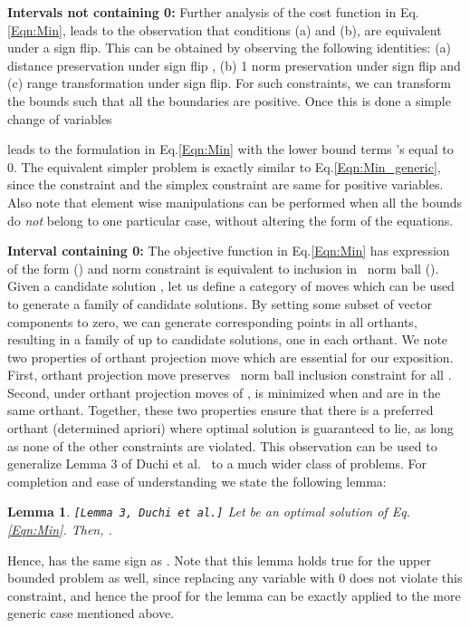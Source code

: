 \documentclass{article}
\newtheorem{lemma}{Lemma}
\def\Lp{~}
\begin{document}
\textbf{Intervals not containing 0: }
Further analysis of the cost function in Eq.\eqref{Eqn:Min}, leads to the observation that conditions (a) and (b), are equivalent under a sign flip. This can be obtained by observing the following identities: (a) distance preservation under sign flip  , (b) 1 norm preservation under sign flip  and (c) range transformation under sign flip.
For such constraints, we can transform the bounds such that all the boundaries are positive.
Once this is done a simple change of variables

leads to the formulation in Eq.\eqref{Eqn:Min} with the lower bound terms 's equal to 0. The equivalent simpler problem is exactly similar to Eq.\eqref{Eqn:Min_generic}, since the  constraint and the simplex constraint are same for positive variables. Also note that
element wise manipulations can be performed when all the bounds do \textit{not} belong to one particular case, without altering the form of the equations.

{\textbf{Interval containing 0: }}
The objective function in Eq.\eqref{Eqn:Min} has expression of the form  () and norm constraint is equivalent to inclusion in \Lp norm ball (). Given a candidate solution , let us define a category of moves which can be used to generate a family of candidate solutions.
By setting some subset of vector components to zero, we can generate corresponding points in all orthants, resulting in a family of  up to  candidate solutions, one in each orthant. We note two properties of orthant projection move which are essential for our exposition. First, orthant projection move preserves \Lp norm ball inclusion constraint for all . Second, under orthant projection moves of ,  is minimized when  and  are in the same orthant.  Together, these two properties ensure that there is a preferred orthant (determined apriori) where optimal solution is guaranteed to lie, as long as none of the other constraints are violated. This observation can be used to generalize Lemma 3 of Duchi et al.~\cite{Duchi08} to a much wider class of problems. For completion and ease of understanding we state the following lemma:
\begin{lemma}\label{Lemma:Duchi3}
\texttt{[Lemma 3, Duchi et al.\cite{Duchi08}]} Let  be an optimal solution of Eq.\eqref{Eqn:Min}. Then,
.
\end{lemma}
Hence,  has the same sign as . Note that this lemma holds true for the upper bounded problem as well, since replacing any variable with 0 does not violate this constraint, and hence the proof for the lemma can be exactly applied to the more generic case mentioned above.
\end{document}
